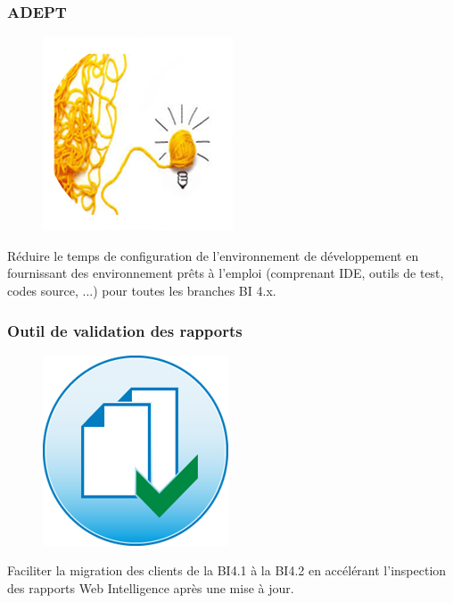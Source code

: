 \subsubsection{ADEPT}
\begin{figure}[H]
  \centering
      \includegraphics{images/adept.png}
\end{figure}
Réduire le temps de configuration de l'environnement de développement en fournissant des environnement prêts à l'emploi (comprenant IDE, outils de test, codes source, ...) pour toutes les branches BI 4.x.

\subsubsection{Outil de validation des rapports}
\begin{figure}[H]
  \centering
      \includegraphics{images/validationtool.png}
\end{figure}
Faciliter la migration des clients de la BI4.1 à la BI4.2 en accélérant l'inspection des rapports Web Intelligence après une mise à jour.



